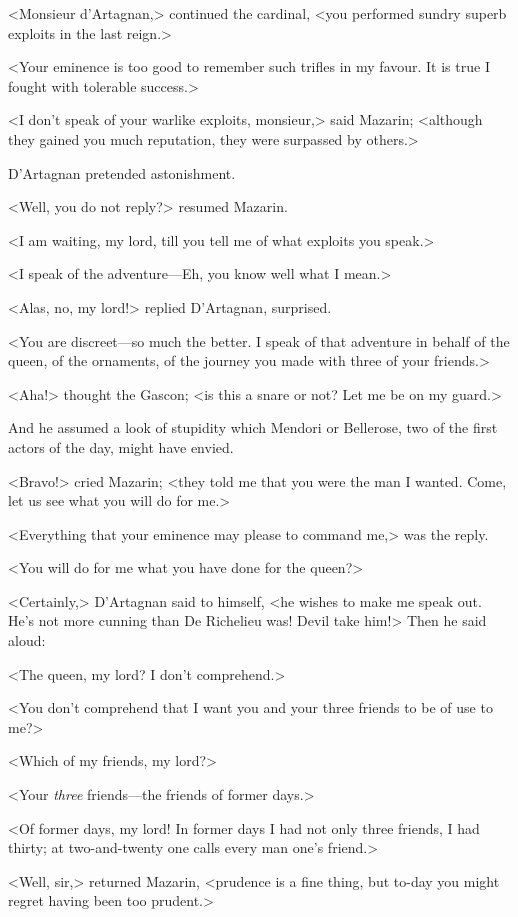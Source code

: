 <Monsieur d'Artagnan,> continued the cardinal, <you performed sundry superb exploits in the last reign.>

<Your eminence is too good to remember such trifles in my favour. It is true I fought with tolerable success.>

<I don't speak of your warlike exploits, monsieur,> said Mazarin; <although they gained you much reputation, they were surpassed by others.>

D'Artagnan pretended astonishment.

<Well, you do not reply?> resumed Mazarin.

<I am waiting, my lord, till you tell me of what exploits you speak.>

<I speak of the adventure—Eh, you know well what I mean.>

<Alas, no, my lord!> replied D'Artagnan, surprised.

<You are discreet—so much the better. I speak of that adventure in behalf of the queen, of the ornaments, of the journey you made with three of your friends.>

<Aha!> thought the Gascon; <is this a snare or not? Let me be on my guard.>

And he assumed a look of stupidity which Mendori or Bellerose, two of the first actors of the day, might have envied.

<Bravo!> cried Mazarin; <they told me that you were the man I wanted. Come, let us see what you will do for me.>

<Everything that your eminence may please to command me,> was the reply.

<You will do for me what you have done for the queen?>

<Certainly,> D'Artagnan said to himself, <he wishes to make me speak out. He's not more cunning than De Richelieu was! Devil take him!> Then he said aloud:

<The queen, my lord? I don't comprehend.>

<You don't comprehend that I want you and your three friends to be of use to me?>

<Which of my friends, my lord?>

<Your \emph{three} friends—the friends of former days.>

<Of former days, my lord! In former days I had not only three friends, I had thirty; at two-and-twenty one calls every man one's friend.>

<Well, sir,> returned Mazarin, <prudence is a fine thing, but to-day you might regret having been too prudent.>

